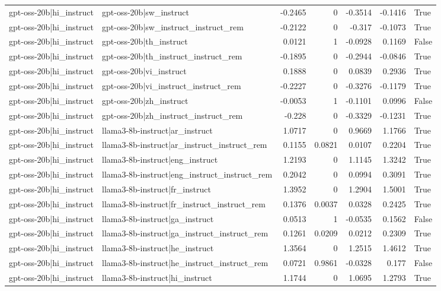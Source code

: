 \begin{table}
\begin{tabular}{l l r r r r l}
gpt-oss-20b|hi_instruct & gpt-oss-20b|sw_instruct & -0.2465 & 0 & -0.3514 & -0.1416 & True \\
gpt-oss-20b|hi_instruct & gpt-oss-20b|sw_instruct_instruct_rem & -0.2122 & 0 & -0.317 & -0.1073 & True \\
gpt-oss-20b|hi_instruct & gpt-oss-20b|th_instruct & 0.0121 & 1 & -0.0928 & 0.1169 & False \\
gpt-oss-20b|hi_instruct & gpt-oss-20b|th_instruct_instruct_rem & -0.1895 & 0 & -0.2944 & -0.0846 & True \\
gpt-oss-20b|hi_instruct & gpt-oss-20b|vi_instruct & 0.1888 & 0 & 0.0839 & 0.2936 & True \\
gpt-oss-20b|hi_instruct & gpt-oss-20b|vi_instruct_instruct_rem & -0.2227 & 0 & -0.3276 & -0.1179 & True \\
gpt-oss-20b|hi_instruct & gpt-oss-20b|zh_instruct & -0.0053 & 1 & -0.1101 & 0.0996 & False \\
gpt-oss-20b|hi_instruct & gpt-oss-20b|zh_instruct_instruct_rem & -0.228 & 0 & -0.3329 & -0.1231 & True \\
gpt-oss-20b|hi_instruct & llama3-8b-instruct|ar_instruct & 1.0717 & 0 & 0.9669 & 1.1766 & True \\
gpt-oss-20b|hi_instruct & llama3-8b-instruct|ar_instruct_instruct_rem & 0.1155 & 0.0821 & 0.0107 & 0.2204 & True \\
gpt-oss-20b|hi_instruct & llama3-8b-instruct|eng_instruct & 1.2193 & 0 & 1.1145 & 1.3242 & True \\
gpt-oss-20b|hi_instruct & llama3-8b-instruct|eng_instruct_instruct_rem & 0.2042 & 0 & 0.0994 & 0.3091 & True \\
gpt-oss-20b|hi_instruct & llama3-8b-instruct|fr_instruct & 1.3952 & 0 & 1.2904 & 1.5001 & True \\
gpt-oss-20b|hi_instruct & llama3-8b-instruct|fr_instruct_instruct_rem & 0.1376 & 0.0037 & 0.0328 & 0.2425 & True \\
gpt-oss-20b|hi_instruct & llama3-8b-instruct|ga_instruct & 0.0513 & 1 & -0.0535 & 0.1562 & False \\
gpt-oss-20b|hi_instruct & llama3-8b-instruct|ga_instruct_instruct_rem & 0.1261 & 0.0209 & 0.0212 & 0.2309 & True \\
gpt-oss-20b|hi_instruct & llama3-8b-instruct|he_instruct & 1.3564 & 0 & 1.2515 & 1.4612 & True \\
gpt-oss-20b|hi_instruct & llama3-8b-instruct|he_instruct_instruct_rem & 0.0721 & 0.9861 & -0.0328 & 0.177 & False \\
gpt-oss-20b|hi_instruct & llama3-8b-instruct|hi_instruct & 1.1744 & 0 & 1.0695 & 1.2793 & True \\

\end{tabular}
\end{table}
